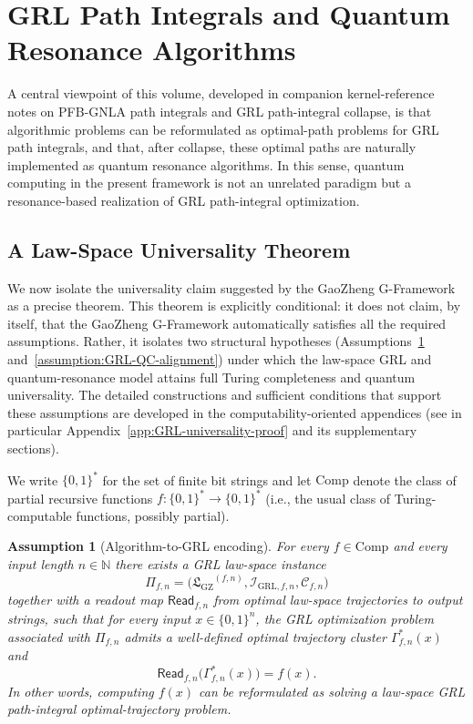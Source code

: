\documentclass[11pt]{book}
\newcommand{\GZLS}{\ensuremath{\mathfrak{L}_{\mathrm{GZ}}}}
\theoremstyle{plain}
\newtheorem{assumption}[theorem]{Assumption}
\theoremstyle{definition}
\theoremstyle{remark}
\begin{document}
\section{GRL Path Integrals and Quantum Resonance Algorithms}


A central viewpoint of this volume, developed in companion kernel-reference
notes on PFB-GNLA path integrals and GRL path-integral collapse, is that
algorithmic problems can be reformulated as optimal-path problems for GRL
path integrals, and that, after collapse, these optimal paths are naturally
implemented as quantum resonance algorithms. In this sense, quantum
computing in the present framework is not an unrelated paradigm but a
resonance-based realization of GRL path-integral optimization.

\subsection{A Law-Space Universality Theorem}


We now isolate the universality claim suggested by the GaoZheng G-Framework
as a precise theorem. This theorem is explicitly conditional: it does not
claim, by itself, that the GaoZheng G-Framework automatically satisfies all
the required assumptions. Rather, it isolates two structural hypotheses
(Assumptions~\ref{assumption:GRL-encoding}
and~\ref{assumption:GRL-QC-alignment}) under which the law-space GRL and
quantum-resonance model attains full Turing completeness and quantum
universality. The detailed constructions and sufficient conditions that
support these assumptions are developed in the computability-oriented
appendices (see in particular
Appendix~\ref{app:GRL-universality-proof} and its supplementary sections).

We write $\{0,1\}^\ast$ for the set of finite bit
strings and let $\mathrm{Comp}$ denote the class of partial recursive
functions $f:\{0,1\}^\ast\to\{0,1\}^\ast$ (i.e., the usual class of
Turing-computable functions, possibly partial).

\begin{assumption}[Algorithm-to-GRL encoding]\label{assumption:GRL-encoding}
For every $f\in\mathrm{Comp}$ and every input length $n\in\mathbb{N}$ there
exists a GRL law-space instance
\[
  \Pi_{f,n}
  =
  \bigl(
    \GZLS^{(f,n)},
    \mathcal{I}_{\mathrm{GRL},f,n},
    \mathcal{C}_{f,n}
  \bigr)
\]
together with a readout map
$\mathsf{Read}_{f,n}$ from optimal law-space trajectories to output strings,
such that for every input $x\in\{0,1\}^n$, the GRL optimization problem
associated with $\Pi_{f,n}$ admits a well-defined optimal trajectory cluster
$\Gamma_{f,n}^\ast(x)$ and
\[
  \mathsf{Read}_{f,n}\bigl(\Gamma_{f,n}^\ast(x)\bigr) = f(x).
\]
In other words, computing $f(x)$ can be reformulated as solving a
law-space GRL path-integral optimal-trajectory problem.
\end{assumption}
\end{document}
